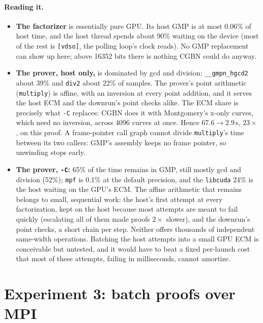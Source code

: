 \documentclass[11pt,a4paper]{article}
\newcommand{\code}[1]{\texttt{#1}}
\begin{document}
\paragraph{Reading it.}
\begin{itemize}
  \item \textbf{The factorizer} is essentially pure GPU. Its host GMP is at
    most 0.06\% of host time, and the host thread spends about 90\% waiting
    on the device (most of the rest is \code{[vdso]}, the polling loop's
    clock reads). No GMP replacement can show up here; above 16352 bits
    there is nothing CGBN could do anyway.
  \item \textbf{The prover, host only,} is dominated by gcd and division:
    \code{\_\_gmpn\_hgcd2} about 39\% and \code{div2} about 22\% of
    samples. The prover's point arithmetic (\code{multiply}) is affine, with
    an inversion at every point addition, and it serves the host ECM and
    the downrun's point checks alike. The ECM share is precisely what
    \code{-C} replaces: CGBN does it with Montgomery's x-only curves, which
    need no inversion, across 4096 curves at once. Hence $67.6 \to 2.9$\,s,
    $23\times$, on this proof. A frame-pointer call graph cannot divide
    \code{multiply}'s time between its two callers: GMP's assembly keeps no
    frame pointer, so unwinding stops early.
  \item \textbf{The prover, \code{-C}:} 65\% of the time remains in GMP,
    still mostly gcd and division (52\%); \code{mpf} is 0.1\% at the
    default precision, and the \code{libcuda} 24\% is the host waiting on
    the GPU's ECM. The affine arithmetic that remains belongs to small,
    sequential work: the host's first attempt at every factorization, kept
    on the host because most attempts are meant to fail quickly
    (escalating all of them made proofs $2\times$ slower), and the
    downrun's point checks, a short chain per step. Neither offers
    thousands of independent same-width operations. Batching the host
    attempts into a small GPU ECM is conceivable but untested, and it would
    have to beat a fixed per-launch cost that most of these attempts,
    failing in milliseconds, cannot amortize.
\end{itemize}

\section{Experiment 3: batch proofs over MPI}
\label{sec:exp3}
\end{document}
